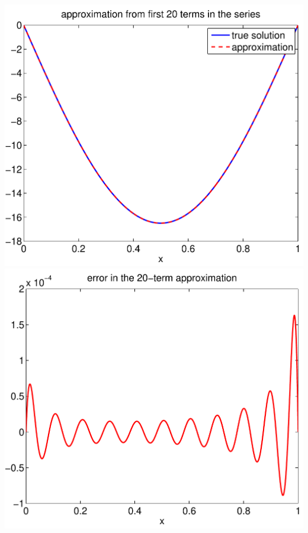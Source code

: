 {\begin{solution}
\begin{enumerate}
\begin{center}
   \includegraphics[scale=0.4]{bvps4_20}\quad
   \includegraphics[scale=0.4]{bvps4_20_err}
\end{center}






\end{enumerate}
\end{solution}}
